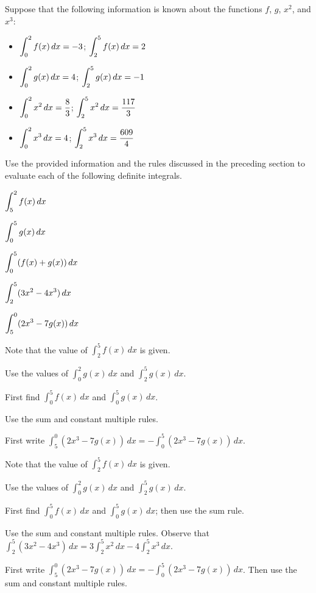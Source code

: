 \begin{activity} \label{A:4.3.2}  Suppose that the following information is known about the functions $f$, $g$, $x^2$, and $x^3$:
\begin{itemize}
	\item $\displaystyle \int_0^2 f(x) \, dx = -3$; $\displaystyle \int_2^5 f(x) \, dx = 2$
	\item $\displaystyle \int_0^2 g(x) \, dx = 4$; $\displaystyle \int_2^5 g(x) \, dx = -1$
	\item $\displaystyle \int_0^2 x^2 \, dx = \frac{8}{3}$; $\displaystyle \int_2^5 x^2 \, dx = \frac{117}{3}$
	\item $\displaystyle \int_0^2 x^3 \, dx = 4$; $\displaystyle \int_2^5 x^3 \, dx = \frac{609}{4} $
\end{itemize}
Use the provided information and the rules discussed in the preceding section to evaluate each of the following definite integrals.
\bmtwo\ba
	\item $\displaystyle \int_5^2 f(x) \, dx$
	\item $\displaystyle \int_0^5 g(x) \, dx$
	\item $\displaystyle \int_0^5 (f(x) + g(x))\, dx$
	\item $\displaystyle \int_2^5 (3x^2 - 4x^3) \, dx$
	\item $\displaystyle \int_5^0 (2x^3 - 7g(x)) \, dx$
\ea\emtwo
\end{activity}
\begin{smallhint}
\ba
	\item Note that the value of $\int_2^5 f(x) \, dx$ is given.
	\item Use the values of $\int_0^2 g(x) \,dx$ and $\int_2^5 g(x) \,dx$.
	\item First find $\int_0^5 f(x) \, dx$ and $\int_0^5 g(x) \, dx$.
	\item Use the sum and constant multiple rules.
	\item First write $\int_5^0 (2x^3 - 7g(x)) \, dx = -\int_0^5 (2x^3 - 7g(x)) \, dx$.
\ea
\end{smallhint}
\begin{bighint}
\ba
	\item Note that the value of $\int_2^5 f(x) \, dx$ is given.
	\item Use the values of $\int_0^2 g(x) \,dx$ and $\int_2^5 g(x) \,dx$.
	\item First find $\int_0^5 f(x) \, dx$ and $\int_0^5 g(x) \, dx$; then use the sum rule.
	\item Use the sum and constant multiple rules.  Observe that $\int_2^5 (3x^2 - 4x^3) \, dx = 3\int_2^5 x^2 \, dx - 4\int_2^5 x^3 \, dx.$
	\item First write $\int_5^0 (2x^3 - 7g(x)) \, dx = -\int_0^5 (2x^3 - 7g(x)) \, dx$.  Then use the sum and constant multiple rules.
\ea
\end{bighint}
